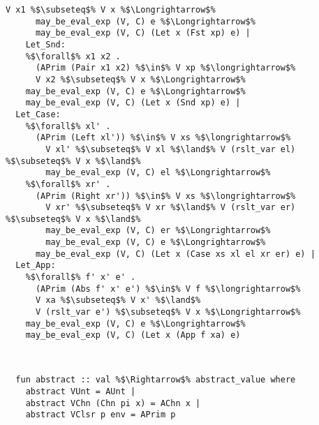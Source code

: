 \documentclass{article}
\begin{document}
\begin{lstlisting}[style=codestyle1, escapechar=\%]
        V x1 %$\subseteq$% V x %$\Longrightarrow$% 
      may_be_eval_exp (V, C) e %$\Longrightarrow$% 
      may_be_eval_exp (V, C) (Let x (Fst xp) e) |
    Let_Snd: 
    %$\forall$% x1 x2 .
      (APrim (Pair x1 x2) %$\in$% V xp %$\longrightarrow$%
      V x2 %$\subseteq$% V x %$\Longrightarrow$% 
    may_be_eval_exp (V, C) e %$\Longrightarrow$% 
    may_be_eval_exp (V, C) (Let x (Snd xp) e) |
  Let_Case:
    %$\forall$% xl' .
      (APrim (Left xl')) %$\in$% V xs %$\longrightarrow$%
        V xl' %$\subseteq$% V xl %$\land$% V (rslt_var el) %$\subseteq$% V x %$\land$%
        may_be_eval_exp (V, C) el %$\Longrightarrow$%
    %$\forall$% xr' .
      (APrim (Right xr')) %$\in$% V xs %$\longrightarrow$%
        V xr' %$\subseteq$% V xr %$\land$% V (rslt_var er) %$\subseteq$% V x %$\land$%
        may_be_eval_exp (V, C) er %$\Longrightarrow$%
        may_be_eval_exp (V, C) e %$\Longrightarrow$% 
      may_be_eval_exp (V, C) (Let x (Case xs xl el xr er) e) |
  Let_App:
    %$\forall$% f' x' e' .
      (APrim (Abs f' x' e') %$\in$% V f %$\longrightarrow$%
      V xa %$\subseteq$% V x' %$\land$%
      V (rslt_var e') %$\subseteq$% V x %$\Longrightarrow$% 
    may_be_eval_exp (V, C) e %$\Longrightarrow$% 
    may_be_eval_exp (V, C) (Let x (App f xa) e)

  \end{lstlisting}
\begin{lstlisting}[style=codestyle1, escapechar=\%]


  fun abstract :: val %$\Rightarrow$% abstract_value where
    abstract VUnt = AUnt |
    abstract VChn (Chn pi x) = AChn x |
    abstract VClsr p env = APrim p

  \end{lstlisting}
\end{document}

